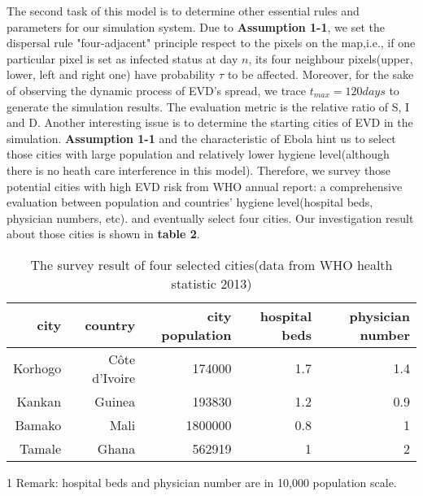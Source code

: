 The second task of this model is to determine other essential rules and parameters for our simulation system. Due to \textbf{Assumption 1-1}, we set the dispersal rule "four-adjacent" principle respect to the pixels on the map,i.e., if one particular pixel is set as infected status at day $n$, its four neighbour pixels(upper, lower, left and right one) have probability $\tau$ to be affected. Moreover, for the sake of observing the dynamic process of EVD's spread, we trace $t_{max}=120days$ to generate the simulation results. The evaluation metric is the relative ratio of S, I and D. Another interesting issue is to determine the starting cities of EVD in the simulation. \textbf{Assumption 1-1} and the characteristic of Ebola hint us to select those cities with large population and relatively lower hygiene level(although there is no heath care interference in this model). Therefore, we survey those potential cities with high EVD risk from WHO annual report\cite{worldworld}: a comprehensive evaluation between population and countries' hygiene level(hospital beds, physician numbers, etc). and eventually select four cities. Our investigation result about those cities is shown in \textbf{table 2}.
\begin{table}[htbp]
\centering
\caption{The survey result of four selected cities(data from WHO health statistic 2013)}
\begin{tabular}{|r|r|r|r|r|}
\hline
{\bf city} & {\bf country} & {\bf city population} & {\bf hospital beds\tnote{1}} & {\bf physician number\tnote{2}} \\
\hline
   Korhogo & Côte d'Ivoire &     174000 &        1.7 &        1.4 \\
\hline
    Kankan &     Guinea &     193830 &        1.2 &        0.9 \\
\hline
    Bamako &       Mali &    1800000 &        0.8 &          1 \\
\hline
    Tamale &      Ghana &     562919 &          1 &          2 \\
\hline
\end{tabular}  
\begin{tablenotes}
        \footnotesize
        \item[1] Remark: hospital beds and physician number are in 10,000 population scale.
\end{tablenotes}

\end{table}


